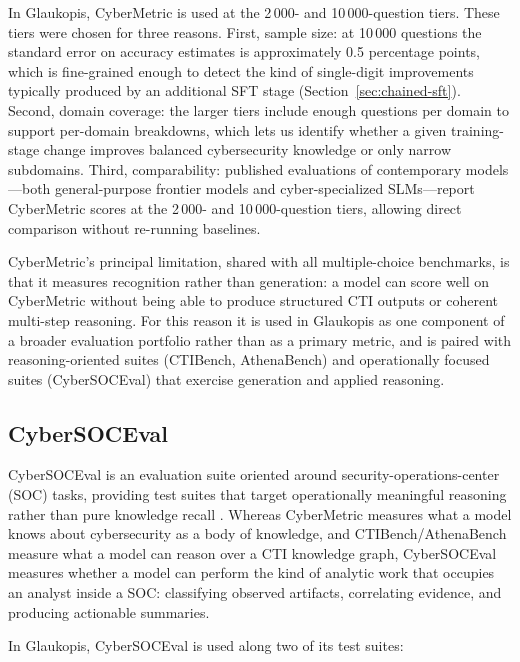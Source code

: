 \documentclass[unnumsec,webpdf,contemporary,large]{oup-authoring-template}
\theoremstyle{thmstyleone}
\theoremstyle{thmstyletwo}
\theoremstyle{thmstylethree}
\begin{document}
In Glaukopis, CyberMetric is used at the 2\,000- and 10\,000-question tiers. These tiers were chosen for three reasons. First, sample size: at 10\,000 questions the standard error on accuracy estimates is approximately 0.5 percentage points, which is fine-grained enough to detect the kind of single-digit improvements typically produced by an additional SFT stage (Section~\ref{sec:chained-sft}). Second, domain coverage: the larger tiers include enough questions per domain to support per-domain breakdowns, which lets us identify whether a given training-stage change improves balanced cybersecurity knowledge or only narrow subdomains. Third, comparability: published evaluations of contemporary models---both general-purpose frontier models and cyber-specialized SLMs---report CyberMetric scores at the 2\,000- and 10\,000-question tiers, allowing direct comparison without re-running baselines.

CyberMetric's principal limitation, shared with all multiple-choice benchmarks, is that it measures recognition rather than generation: a model can score well on CyberMetric without being able to produce structured CTI outputs or coherent multi-step reasoning. For this reason it is used in Glaukopis as one component of a broader evaluation portfolio rather than as a primary metric, and is paired with reasoning-oriented suites (CTIBench, AthenaBench) and operationally focused suites (CyberSOCEval) that exercise generation and applied reasoning.

\subsection{CyberSOCEval}
\label{sec:cybersoceval}

CyberSOCEval is an evaluation suite oriented around security-operations-center (SOC) tasks, providing test suites that target operationally meaningful reasoning rather than pure knowledge recall \cite{cybersoceval2025}. Whereas CyberMetric measures what a model knows about cybersecurity as a body of knowledge, and CTIBench/AthenaBench measure what a model can reason over a CTI knowledge graph, CyberSOCEval measures whether a model can perform the kind of analytic work that occupies an analyst inside a SOC: classifying observed artifacts, correlating evidence, and producing actionable summaries.

In Glaukopis, CyberSOCEval is used along two of its test suites:
\end{document}
